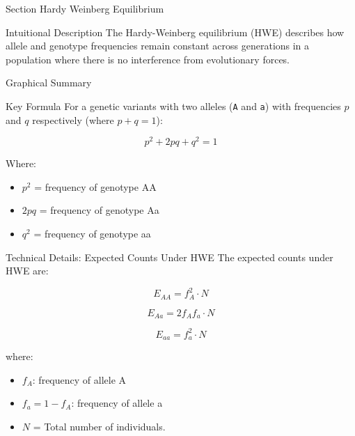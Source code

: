 
\begin{frame}{Section}
\centering
\Huge{Hardy Weinberg Equilibrium}
\end{frame}


\begin{frame}{Intuitional Description}
The Hardy-Weinberg equilibrium (HWE) describes how allele and genotype frequencies remain constant across generations in a population where there is no interference from evolutionary forces.
\end{frame}

\begin{frame}{Graphical Summary}

\end{frame}


\begin{frame}{Key Formula}
For a genetic variants with two alleles (\texttt{A} and \texttt{a}) with frequencies $p$ and $q$ respectively (where $p + q = 1$):

$$p^2 + 2pq + q^2 = 1$$

Where:
\begin{itemize}
\item $p^2$ = frequency of genotype AA
\item $2pq$ = frequency of genotype Aa
\item $q^2$ = frequency of genotype aa
\end{itemize}
\end{frame}


\begin{frame}{Technical Details: Expected Counts Under HWE}
The expected counts under HWE are:

$$
E_{AA} = f_A^2 \cdot N
$$

$$
E_{Aa} = 2f_A f_a \cdot N
$$

$$
E_{aa} = f_a^2 \cdot N
$$

where:  
\begin{itemize}
\item $f_A$: frequency of allele A
\item $f_a = 1 - f_A$: frequency of allele a
\item $N$ = Total number of individuals.
\end{itemize}

\end{frame}

